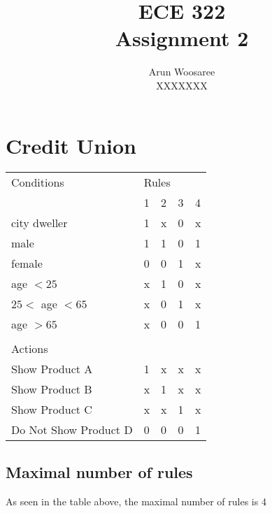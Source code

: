 \documentclass[letterpaper]{article}
\title{ECE 322 \\
Assignment 2}
\author{Arun Woosaree\\
  XXXXXXX}
\begin{document}
\maketitle %

\section{Credit Union}
\begin{adjustbox}{center}
	\begin{tabularx}{\textwidth}{lllll}
		Conditions            & \multicolumn{4}{l}{Rules}             \\
		                      & 1                         & 2 & 3 & 4 \\ \cline{2-5}
		city dweller          & 1                         & x & 0 & x \\
		male                  & 1                         & 1 & 0 & 1 \\
		female                & 0                         & 0 & 1 & x \\
		age $<25$             & x                         & 1 & 0 & x \\
		$25<$ age $<65$       & x                         & 0 & 1 & x \\
		age $>65$             & x                         & 0 & 0 & 1 \\
		                      &                           &   &   &   \\
		Actions               &                           &   &   &   \\ \cline{1-1}
		Show Product A        & 1                         & x & x & x \\
		Show Product B        & x                         & 1 & x & x \\
		Show Product C        & x                         & x & 1 & x \\
		Do Not Show Product D & 0                         & 0 & 0 & 1 \\
	\end{tabularx}%
\end{adjustbox}
\subsection{Maximal number of rules}
As seen in the table above, the maximal number of rules is 4
\end{document}
